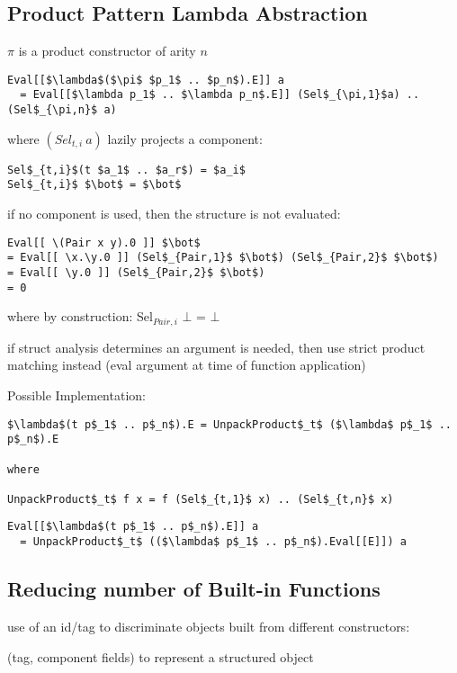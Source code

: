 \documentclass[8pt]{extarticle}
\begin{document}
\begin{multicols*}{2}
\subsection{Product Pattern Lambda Abstraction}

$\pi$ is a product constructor of arity $n$

\begin{lstlisting}
Eval[[$\lambda$($\pi$ $p_1$ .. $p_n$).E]] a
  = Eval[[$\lambda p_1$ .. $\lambda p_n$.E]] (Sel$_{\pi,1}$a) .. (Sel$_{\pi,n}$ a)
\end{lstlisting}

where $(Sel_{t,i}\ a)$ lazily projects a component:

\begin{lstlisting}
Sel$_{t,i}$(t $a_1$ .. $a_r$) = $a_i$
Sel$_{t,i}$ $\bot$ = $\bot$
\end{lstlisting}

if no component is used, then the structure is not evaluated:

\begin{lstlisting}
Eval[[ \(Pair x y).0 ]] $\bot$
= Eval[[ \x.\y.0 ]] (Sel$_{Pair,1}$ $\bot$) (Sel$_{Pair,2}$ $\bot$)
= Eval[[ \y.0 ]] (Sel$_{Pair,2}$ $\bot$)
= 0 
\end{lstlisting}
where by construction: Sel$_{Pair,i}$ $\bot$ = $\bot$

if struct analysis determines an argument is needed, then use strict product matching instead (eval argument at time of function application)

  Possible Implementation:
\begin{lstlisting}
$\lambda$(t p$_1$ .. p$_n$).E = UnpackProduct$_t$ ($\lambda$ p$_1$ .. p$_n$).E

where

UnpackProduct$_t$ f x = f (Sel$_{t,1}$ x) .. (Sel$_{t,n}$ x)
\end{lstlisting}

\begin{lstlisting}
Eval[[$\lambda$(t p$_1$ .. p$_n$).E]] a
  = UnpackProduct$_t$ (($\lambda$ p$_1$ .. p$_n$).Eval[[E]]) a
\end{lstlisting}

  \subsection{Reducing number of Built-in Functions}
  use of an id/tag to discriminate objects built from different constructors:

  (tag, component fields) to represent a structured object


\end{multicols*}
\end{document}
